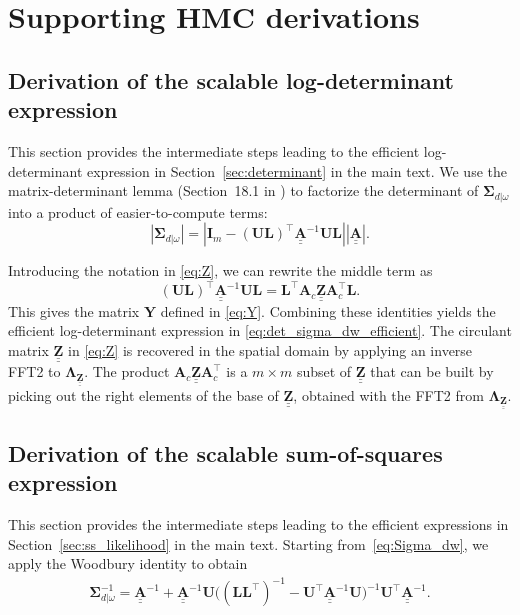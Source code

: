 \documentclass[12pt]{article}
\newcommand{\mybcirc}[1] {\underline{\underline{\bm{#1}}}}
\begin{document}
\section{Supporting HMC derivations}\label{ap:supporting_hmc}

\subsection{Derivation of the scalable log-determinant expression} \label{ap:scalable_logdet}

This section provides the intermediate steps leading to the efficient log-determinant expression in Section~\ref{sec:determinant} in the main text. We use the matrix-determinant lemma (Section~18.1 in \citet{Harville1997}) to factorize the determinant of $\bm{\Sigma}_{d|\omega}$ into a product of easier-to-compute terms:
\begin{equation}
    |\bm{\Sigma}_{d|\omega}|
    =
    \left|
    \bm{I}_m - (\bm{UL})^{\top} \mybcirc{A}^{-1} \bm{UL}
    \right|
    |\mybcirc{A}|.
\end{equation}

Introducing the notation in \eqref{eq:Z}, we can rewrite the middle term as
\begin{equation}
    (\bm{UL})^{\top} \mybcirc{A}^{-1} \bm{UL}
    =
    \bm{L}^{\top} \bm{A}_c \mybcirc{Z} \bm{A}_c^{\top} \bm{L}.
\end{equation}
This gives the matrix $\bm{Y}$ defined in \eqref{eq:Y}.
Combining these identities yields the efficient log-determinant expression in \eqref{eq:det_sigma_dw_efficient}.
The circulant matrix $\mybcirc{Z}$ in \eqref{eq:Z} is recovered in the spatial domain by applying an inverse FFT2 to $\bm{\Lambda}_{\mybcirc{Z}}$. 
The product $\bm{A}_c \mybcirc{Z} \bm{A}_c^{\top}$ is a $m \times m$ subset of $\mybcirc{Z}$ that can be built by picking out the right elements of the base of $\mybcirc{Z}$, obtained with the FFT2 from $\bm{\Lambda}_{\mybcirc{Z}}$. 
\subsection{Derivation of the scalable sum-of-squares expression} \label{ap:scalable_ss}

This section provides the intermediate steps leading to the efficient expressions in Section~\ref{sec:ss_likelihood} in the main text. Starting from~\eqref{eq:Sigma_dw}, we apply the Woodbury identity to obtain
\begin{equation}
\begin{split}
    \bm{\Sigma}_{d|\omega}^{-1}
    =
    \mybcirc{A}^{-1}
    +
    \mybcirc{A}^{-1}\bm{U}
    \bigl(
        (\bm{L}\bm{L}^{\top})^{-1}
        -
        \bm{U}^{\top}\mybcirc{A}^{-1}\bm{U}
    \bigr)^{-1}
    \bm{U}^{\top}\mybcirc{A}^{-1}.
\end{split}
\end{equation}
\end{document}
